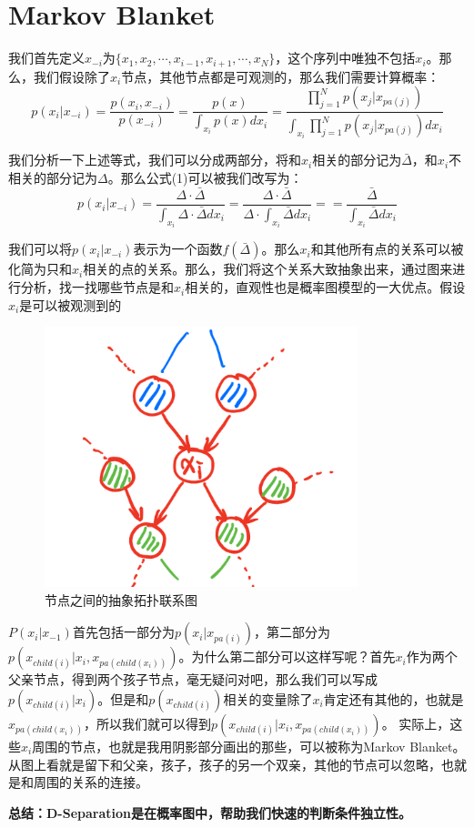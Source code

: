 \documentclass[a4paper]{article}
\begin{document}
\section{Markov Blanket}

我们首先定义$x_{-i}$为$\{x_1,x_2,\cdots,x_{i-1},x_{i+1},\cdots,x_N\}$，这个序列中唯独不包括$x_i$。那么，我们假设除了$x_i$节点，其他节点都是可观测的，那么我们需要计算概率：
\begin{equation}
    p(x_i|x_{-i}) = \frac{p(x_i, x_{-i})}{p(x_{-i})} = \frac{p(x)}{\int_{x_i}p(x)dx_i} = \frac{\prod_{j=1}^N p(x_j|x_{pa(j)})}{\int_{x_i}\prod_{j=1}^N p(x_j|x_{pa(j)})dx_i}
\end{equation}

我们分析一下上述等式，我们可以分成两部分，将和$x_i$相关的部分记为$\bar{\Delta}$，和$x_i$不相关的部分记为$\Delta$。那么公式(1)可以被我们改写为：
\begin{equation}
     p(x_i|x_{-i})= \frac{\Delta\cdot \bar{\Delta}}{\int_{x_i}\Delta\cdot \bar{\Delta}dx_i} = \frac{\Delta\cdot \bar{\Delta}}{\Delta\cdot \int_{x_i} \bar{\Delta}dx_i} = = \frac{ \bar{\Delta}}{ \int_{x_i} \bar{\Delta}dx_i}
\end{equation}

我们可以将$p(x_i|x_{-i})$表示为一个函数$f(\bar{\Delta})$。那么$x_i$和其他所有点的关系可以被化简为只和$x_i$相关的点的关系。那么，我们将这个关系大致抽象出来，通过图来进行分析，找一找哪些节点是和$x_i$相关的，直观性也是概率图模型的一大优点。假设$x_i$是可以被观测到的
\begin{figure}[H]
    \centering
    \includegraphics[width=.55\textwidth]{微信图片_20191125153322.png}
    \caption{节点之间的抽象拓扑联系图}
    \label{fig:my_label_1}
\end{figure}

$P(x_i|x_{-1})$首先包括一部分为$p(x_i|x_{pa(i)})$，第二部分为$p(x_{child(i)}|x_i,x_{pa(child(x_i))})$。为什么第二部分可以这样写呢？首先$x_i$作为两个父亲节点，得到两个孩子节点，毫无疑问对吧，那么我们可以写成$p(x_{child(i)}|x_i)$。但是和$p(x_{child(i)})$相关的变量除了$x_i$肯定还有其他的，也就是$x_{pa(child(x_i))}$，所以我们就可以得到$p(x_{child(i)}|x_i,x_{pa(child(x_i))})$。
实际上，这些$x_i$周围的节点，也就是我用阴影部分画出的那些，可以被称为Markov Blanket。从图上看就是留下和父亲，孩子，孩子的另一个双亲，其他的节点可以忽略，也就是和周围的关系的连接。

\textbf{总结：D-Separation是在概率图中，帮助我们快速的判断条件独立性。}
\end{document}
